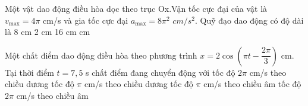 %

\begin{vidu}%
Một vật dao động điều hòa dọc theo trục Ox.Vận tốc cực đại của vật là $v_{\max} = 4\pi$  cm/s và gia tốc cực đại $a_{\max} = 8\pi ^2$ $ cm/s^2$. Quỹ đạo dao động có độ dài là
\choice
{8 cm}
{2 cm}
{16 cm}
{ cm}
\end{vidu} %
\begin{vidu}%
Một chất điểm dao động điều hòa theo phương trình $x = 2\cos\left(\pi t - \dfrac{2\pi}{3}\right)$ cm. Tại thời điểm $t = 7,5$ s chất điểm đang chuyển động với
\choice
{tốc độ $2\pi$ cm/s theo chiều dương}
{tốc độ $\pi$ cm/s theo chiều dương}
{\True tốc độ $\pi$ cm/s theo chiều âm}
{tốc độ $2\pi$ cm/s theo chiều âm}
\end{vidu} %

